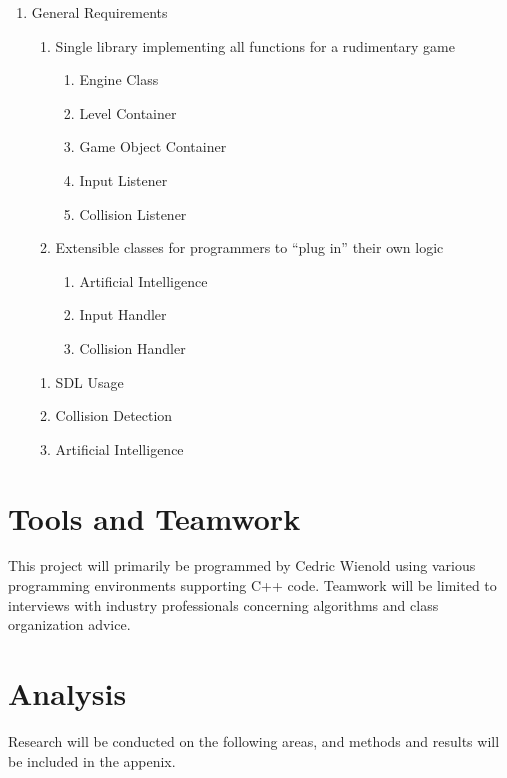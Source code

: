 \documentclass[12pt]{article}
\begin{document}
\begin{enumerate}
  \item General Requirements

  \begin{enumerate}
    \item Single library implementing all functions for a rudimentary game

    \begin{enumerate}
      \item Engine Class
      \item Level Container
      \item Game Object Container
      \item Input Listener
      \item Collision Listener
    \end{enumerate}

    \item Extensible classes for programmers to ``plug in'' their own logic

    \begin{enumerate}
      \item Artificial Intelligence
      \item Input Handler
      \item Collision Handler
    \end{enumerate}

  \end{enumerate}

  \begin{enumerate}
    \item SDL Usage
    \item Collision Detection
    \item Artificial Intelligence
  \end{enumerate}

\end{enumerate}



  \section{Tools and Teamwork}
    This project will primarily be programmed by Cedric Wienold using various programming environments supporting C++ code. Teamwork will be limited to interviews with industry professionals concerning algorithms and class organization advice.

  \section{Analysis}
    Research will be conducted on the following areas, and methods and results will be included in the appenix.
\end{document}
